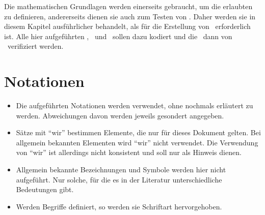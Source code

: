 Die mathematischen Grundlagen werden einerseits gebraucht, um die erlaubten  zu definieren, andererseits dienen sie auch zum Testen von \ASBA.
Daher werden sie in diesem Kapitel ausführlicher behandelt, als für die Erstellung von \ASBA\ erforderlich ist.
Alle hier aufgeführten \Axiome, \Saetze\ und \Beweise\ sollen dazu kodiert und die \Beweise\ dann von \ASBA\ verifiziert werden.

\section{Notationen}%
\label{sec:Notationen}

\begin{itemize}
	\item Die  aufgeführten Notationen werden  verwendet, ohne nochmals erläutert zu werden. Abweichungen davon werden jeweils gesondert angegeben.
	\item Sätze mit \enquote{wir} bestimmen Elemente, die nur für dieses Dokument gelten.
	Bei allgemein bekannten Elementen wird \enquote{wir} nicht verwendet.
	Die Verwendung von \enquote{wir} ist allerdings nicht konsistent und soll nur als Hinweis dienen.
	\item Allgemein bekannte Bezeichnungen und Symbole werden hier nicht aufgeführt.
	Nur solche, für die es in der Literatur unterschiedliche Bedeutungen gibt.
	\item Werden Begriffe definiert, so werden sie  Schriftart hervorgehoben.
\end{itemize}
